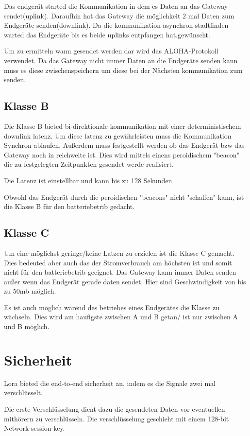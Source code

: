\documentclass[a4paper,12pt]{article}
\begin{document}
    Das endgerät started die Kommunikation in dem es Daten an das Gateway sendet(uplink). Daraufhin hat das Gateway die möglichkeit 2 mal Daten zum Endgeräte senden(downlink). Da die kommunikation asynchron stadtfinden warted das Endgeräte bis es beide uplinks entpfangen hat.gewünscht.

    Um zu ermitteln wann gesendet werden dar wird das ALOHA-Protokoll verwendet.
    Da das Gateway nicht immer Daten an die Endgeräte senden kann muss es diese zwischenspeichern um diese bei der Nächsten kommunikation zum senden.
    \subsection{Klasse B}
    Die Klasse B bieted bi-direktionale kommunikation mit einer deterministischem downlink latenz. Um diese latenz zu gewährleisten muss die Kommunikation Synchron ablaufen. Außerdem muss festgestellt werden ob das Endgerät bzw das Gateway noch in reichweite ist. Dies wird mittels einens peroidischem "beacon" die zu festgelegten
    Zeitpunkten gesendet werde realisiert.

    Die Latenz ist einstellbar und kann bis zu 128 Sekunden.

    Obwohl das Endgerät durch die peroidischen "beacons" nicht "schalfen" kann, ist die Klasse B für den batteriebetrib gedacht.

    \subsection{Klasse C}
    Um eine möglichst geringe/keine Latzen zu erzielen ist die Klasse C gemacht. Dies bedeuted aber auch das der Stromverbrauch am höchsten ist und somit nicht für den batteriebetrib geeignet.
    Das Gateway kann immer Daten senden außer wenn das Endgerät gerade daten sendet. Hier sind Geschwindigkeit von bis zu 50mb möglich.


    Es ist auch möglich wärend des betriebes eines Endgerätes die Klasse zu wächseln. Dies wird am haufigste zwischen A und B getan/ ist nur zwischen A und B möglich.
    \section{Sicherheit}
    Lora bieted die end-to-end sicherheit an, indem es die Signale zwei mal verschlüsselt.

    Die erste Verschlüsselung dient dazu die gesendeten Daten vor eventuellen mithörern zu verschlüsseln. Die verschlüsselung geschieht mit einem 128-bit Network-session-key.
\end{document}
